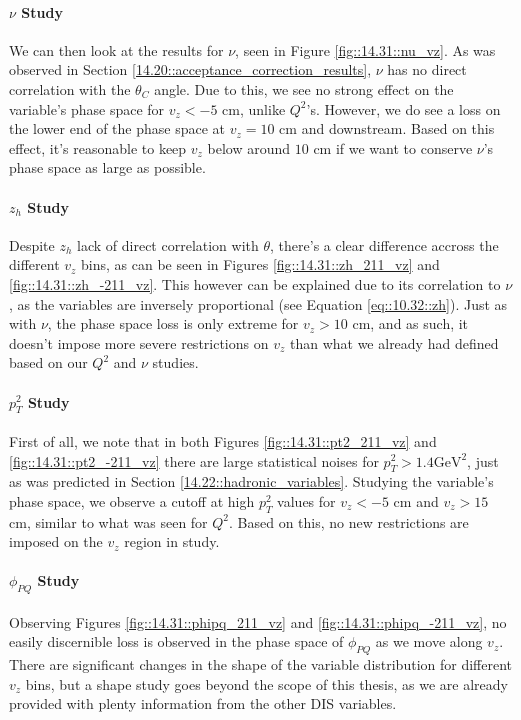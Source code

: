     \paragraph{$\nu$ Study}
        We can then look at the results for $\nu$, seen in Figure \ref{fig::14.31::nu_vz}.
        As was observed in Section \ref{14.20::acceptance_correction_results}, $\nu$ has no direct correlation with the $\theta_C$ angle.
        Due to this, we see no strong effect on the variable's phase space for $v_z < -5$ cm, unlike $Q^2$'s.
        However, we do see a loss on the lower end of the phase space at $v_z = 10$ cm and downstream.
        Based on this effect, it's reasonable to keep $v_z$ below around $10$ cm if we want to conserve $\nu$'s phase space as large as possible.

    \paragraph{$z_h$ Study}
        Despite $z_h$ lack of direct correlation with $\theta$, there's a clear difference accross the different $v_z$ bins, as can be seen in Figures \ref{fig::14.31::zh_211_vz} and \ref{fig::14.31::zh_-211_vz}.
        This however can be explained due to its correlation to $\nu$, as the variables are inversely proportional (see Equation \eqref{eq::10.32::zh}).
        Just as with $\nu$, the phase space loss is only extreme for $v_z > 10$ cm, and as such, it doesn't impose more severe restrictions on $v_z$ than what we already had defined based on our $Q^2$ and $\nu$ studies.

    \paragraph{$p_T^2$ Study}
        First of all, we note that in both Figures \ref{fig::14.31::pt2_211_vz} and \ref{fig::14.31::pt2_-211_vz} there are large statistical noises for $p_T^2 > 1.4 \text{GeV}^2$, just as was predicted in Section \ref{14.22::hadronic_variables}.
        Studying the variable's phase space, we observe a cutoff at high $p_T^2$ values for $v_z < -5$ cm and $v_z > 15$ cm, similar to what was seen for $Q^2$.
        Based on this, no new restrictions are imposed on the $v_z$ region in study.

    \paragraph{$\phi_{PQ}$ Study}
        Observing Figures \ref{fig::14.31::phipq_211_vz} and \ref{fig::14.31::phipq_-211_vz}, no easily discernible loss is observed in the phase space of $\phi_{PQ}$ as we move along $v_z$.
        There are significant changes in the shape of the variable distribution for different $v_z$ bins, but a shape study goes beyond the scope of this thesis, as we are already provided with plenty information from the other DIS variables.
